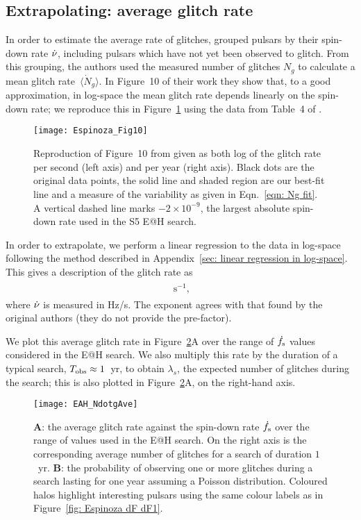 \documentclass[../full_thesis/full_thesis.tex]{subfiles}
\newcommand{\thisdir}{../glitches_in_CGW}
\begin{document}
\subsection{Extrapolating: average glitch rate}
\label{sec: average glitch frequency}
In order to estimate the average rate of glitches, \citet{Espinoza2011}
grouped pulsars by their spin-down rate $\dot{\nu}$, including pulsars
which have not yet been observed to glitch. From this grouping, the authors
used the measured number of glitches $N_{g}$ to calculate a mean
glitch rate~$\langle \dot{N}_{g}\rangle$. In Figure~10 of their work they
show that, to a good approximation, in log-space the mean glitch rate depends linearly on the spin-down rate;
we reproduce this in Figure~\ref{fig: Espinoza 10} using the data from Table~4
of \citet{Espinoza2011}.
\begin{figure}[htb]
\centering
\texttt{[image: Espinoza\_Fig10]}
\caption{Reproduction of Figure~10 from \citet{Espinoza2011} given as both log of
the glitch rate per second (left axis) and per year (right axis). Black
dots are the original data points, the solid line and shaded region are
our best-fit line and a measure of the variability as given in Eqn.~\eqref{eqn:
Ng fit}. A vertical dashed line marks $-2\times10^{-9}$, the largest absolute
spin-down rate used in the S5 E@H search.}
\label{fig: Espinoza 10}
\end{figure}

In order to extrapolate, we perform a linear regression to the data in
log-space following the method described in Appendix~\ref{sec: linear
regression in log-space}.  This gives a description of the glitch rate as
\begin{align}
\begin{split}

\textrm{ s}^{-1},
\end{split}
\label{eqn: Ng fit}
\end{align}
where $\dot{\nu}$ is measured in Hz/s.  The exponent agrees with that found by
the original authors (they do not provide the pre-factor).

We plot this average glitch rate in Figure~\ref{fig: EAH_NdotgAve}A over the
range of $\dot{f}_{\textrm{s}}$ values considered in the E@H search. We also multiply this
rate by the duration of a typical search, $T_{\mathrm{obs}}\approx1$~yr, to obtain
$\lambda_{s}$, the expected number of glitches during the search; this is
also plotted in Figure~\ref{fig: EAH_NdotgAve}A, on the right-hand axis.

\begin{figure}[htb]
\centering
\texttt{[image: EAH\_NdotgAve]}
\caption{\textbf{A}: the average glitch rate against the spin-down rate
$\dot{f}_{\textrm{s}}$ over the range of values used in the E@H search. On the right axis is
the corresponding average number of glitches for a search of duration $1$~yr.
\textbf{B}: the probability of observing one or
more glitches during a search lasting for one year assuming a Poisson distribution. Coloured
halos highlight interesting pulsars using the same colour labels as in
Figure~\ref{fig: Espinoza dF dF1}.}
\label{fig: EAH_NdotgAve}
\end{figure}
\end{document}
